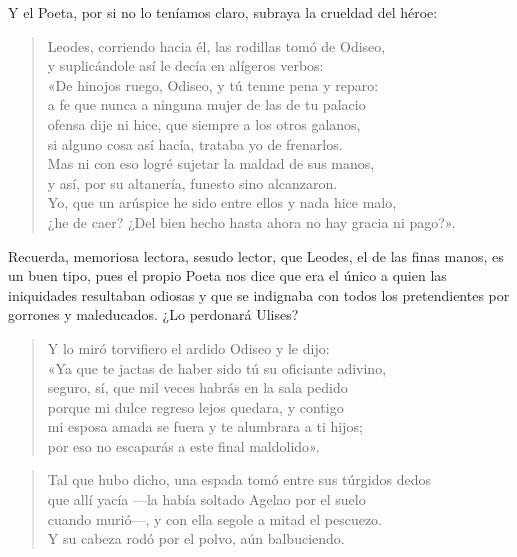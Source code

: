 Y el Poeta, por si no lo teníamos claro, subraya la crueldad del héroe:

\begin{verse}
Leodes, corriendo hacia él, las rodillas tomó de Odiseo,\\
y suplicándole así le decía en alígeros verbos:\\
«De hinojos ruego, Odiseo, y tú tenme pena y reparo:\\
a fe que nunca a ninguna mujer de las de tu palacio\\
ofensa dije ni hice, que siempre a los otros galanos,\\
si alguno cosa así hacía, trataba yo de frenarlos.\\
Mas ni con eso logré sujetar la maldad de sus manos,\\
y así, por su altanería, funesto sino alcanzaron.\\
Yo, que un arúspice he sido entre ellos y nada hice malo,\\
¿he de caer? ¿Del bien hecho hasta ahora no hay gracia ni pago?».
\end{verse}

Recuerda, memoriosa lectora, sesudo lector, que Leodes, el de las finas manos, es un buen tipo, pues el propio Poeta nos dice que era el único a quien las iniquidades resultaban odiosas y que se indignaba con todos los pretendientes por gorrones y maleducados. ¿Lo perdonará Ulises?

\begin{verse}
Y lo miró torvifiero el ardido Odiseo y le dijo:\\
«Ya que te jactas de haber sido tú su oficiante adivino,\\
seguro, sí, que mil veces habrás en la sala pedido\\
porque mi dulce regreso lejos quedara, y contigo\\
mi esposa amada se fuera y te alumbrara a ti hijos;\\
por eso no escaparás a este final maldolido».
\end{verse}

\begin{verse}
Tal que hubo dicho, una espada tomó entre sus túrgidos dedos\\
que allí yacía ---la había soltado Agelao por el suelo\\
cuando murió---, y con ella segole a mitad el pescuezo.\\
Y su cabeza rodó por el polvo, aún balbuciendo.
\end{verse}

